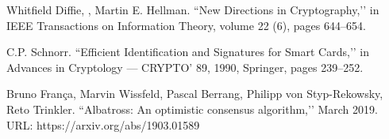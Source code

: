 \documentclass[8pt,fleqn,openany]{book}
\begin{document}
\begin{thebibliography}{99}
 Whitfield Diffie, , Martin E. Hellman. ``New Directions in Cryptography,’’   in IEEE Transactions on Information Theory, volume 22 (6), pages 644–654. 

 C.P. Schnorr. ``Efficient Identification and Signatures for Smart Cards,’’
in Advances in Cryptology — CRYPTO’ 89, 1990, Springer, pages 239–252.

 Bruno Fran{\c c}a, Marvin Wissfeld, Pascal Berrang, Philipp von Styp-Rekowsky, Reto Trinkler. ``Albatross: An optimistic consensus algorithm,’’ March 2019. URL: https://arxiv.org/abs/1903.01589

\end{thebibliography}
\end{document}

